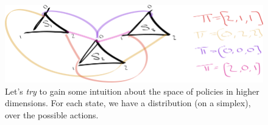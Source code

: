 \begin{figure}
\centering
\includegraphics[width=1\textwidth,height=0.25\textheight]{../../pictures/drawings/3-state-3-action-simplices.png}
\caption{Let's \textit{try} to gain some intuition about the space of policies in higher dimensions.
For each state, we have a distribution (on a simplex), over the possible actions.}
\end{figure}
